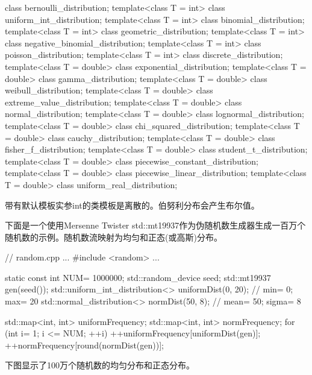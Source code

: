 \begin{cpp}
class bernoulli_distribution;
template<class T = int> class uniform_int_distribution;
template<class T = int> class binomial_distribution;
template<class T = int> class geometric_distribution;
template<class T = int> class negative_binomial_distribution;
template<class T = int> class poisson_distribution;
template<class T = int> class discrete_distribution;
template<class T = double> class exponential_distribution;
template<class T = double> class gamma_distribution;
template<class T = double> class weibull_distribution;
template<class T = double> class extreme_value_distribution;
template<class T = double> class normal_distribution;
template<class T = double> class lognormal_distribution;
template<class T = double> class chi_squared_distribution;
template<class T = double> class cauchy_distribution;
template<class T = double> class fisher_f_distribution;
template<class T = double> class student_t_distribution;
template<class T = double> class piecewise_constant_distribution;
template<class T = double> class piecewise_linear_distribution;
template<class T = double> class uniform_real_distribution;
\end{cpp}

带有默认模板实参int的类模板是离散的。伯努利分布会产生布尔值。

下面是一个使用Mersenne Twister std::mt19937作为伪随机数生成器生成一百万个随机数的示例。随机数流映射为均匀和正态(或高斯)分布。


\begin{cpp}
// random.cpp
...
#include <random>
...

static const int NUM= 1000000;
std::random_device seed;
std::mt19937 gen(seed());
std::uniform_int_distribution<> uniformDist(0, 20); // min= 0; max= 20
std::normal_distribution<> normDist(50, 8); // mean= 50; sigma= 8

std::map<int, int> uniformFrequency;
std::map<int, int> normFrequency;
for (int i= 1; i <= NUM; ++i){
	++uniformFrequency[uniformDist(gen)];
	++normFrequency[round(normDist(gen))];
}
\end{cpp}

下图显示了100万个随机数的均匀分布和正态分布。













